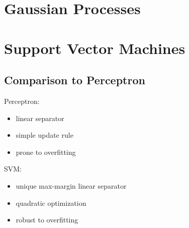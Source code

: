 \documentclass[]{article}
\theoremstyle{definition}
\begin{document}
    

    \section{Gaussian Processes}
    \label{sec:gaussian_processes}
    

    \section{Support Vector Machines}
    \label{sec:support_vector_machines}
    
    \subsection{Comparison to Perceptron}
    \label{sub:comparison_to_perceptron}

    Perceptron:
    \begin{itemize}
        \item linear separator
        \item simple update rule
        \item prone to overfitting
    \end{itemize}
    SVM:
    \begin{itemize}
        \item unique max-margin linear separator
        \item quadratic optimization
        \item robust to overfitting
    \end{itemize}
    
    
     
    
    
\end{document}

